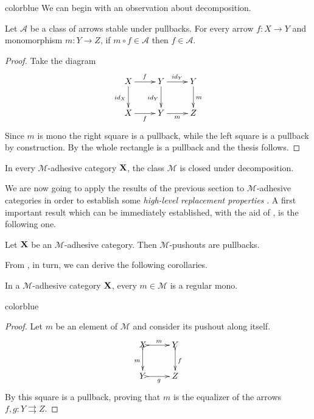 \documentclass[a4paper,UKenglish,cleveref,pdftex,thm-restate,numberwithinsect,anonymous]{lipics}
\newcommand{\full}[1]{{color{blue}#1}}
\newcommand{\full}[1]{}
\newcommand{\id}[1]{\mathsf{id}_{#1}}
\def\X{\textbf {\textup{X}}}
\def\Y{\textbf {\textup{Y}}}
\begin{document}
\full{ 
We can begin with an observation about decomposition.

\begin{proposition}
  \label{prop:deco}Let $\mathcal{A}$ be a class of arrows stable under
  pullbacks. For every arrow $f\colon X\to Y$ and monomorphism
  $m\colon Y\to Z$, if $m\circ f \in\mathcal{A}$ then
  $f\in \mathcal{A}$.
\end{proposition}
\begin{proof}
  Take the diagram
  \[\xymatrix{X \ar[d]_{\id{X}}\ar[r]^{f}& Y \ar[r]^{\id{Y}}  \ar[d]_{\id{Y}}& Y \ar[d]^{m}\\
		X \ar[r]_{f}& Y \ar[r]_{m} & Z}\]
	Since $m$ is mono the right square is a pullback, while the left square is a pullback by construction. By \Cref{lem:pb1} the whole rectangle is a pullback and the thesis follows.
\end{proof}
\begin{corollary}
  \label{cor:deco}
	In every $\mathcal{M}$-adhesive category $\X$, the class $\mathcal{M}$ is closed under decomposition.
\end{corollary}}


We are now going to apply the results of the previous section to $\mathcal{M}$-adhesive categories in order to establish some \emph{high-level replacement properties} \cite{ehrig2004adhesive,ehrig2014adhesive,ehrig2006fundamentals}.  
A first important  result which can be immediately established, with the aid of , is the following one.

\begin{proposition}
	\label{prop:pbpoad}
	Let $\X$ be an $\mathcal{M}$-adhesive category. Then
	$\mathcal{M}$-pushouts are pullbacks.
\end{proposition}

From , in turn, we can derive the following corollaries.
\begin{corollary}\label{cor:rego}
	In a $\mathcal{M}$-adhesive category $\X$, every $m\in\mathcal{M}$ is a regular mono.
\end{corollary}
\full{ 
\begin{proof}
	Let $m$ be an element of $\mathcal{M}$ and consider its pushout along itself.
	\[\xymatrix{X\ar@{>->}[r]^m \ar@{>->}[d]_m& Y\ar@{>->}[d]^{f}\\Y \ar@{>->}[r]_g & Z}\]
	By \Cref{prop:pbpoad} this square is a pullback, proving that $m$ is the equalizer of the arrows $f,g\colon Y\rightrightarrows Z$.
\end{proof}}
\end{document}
